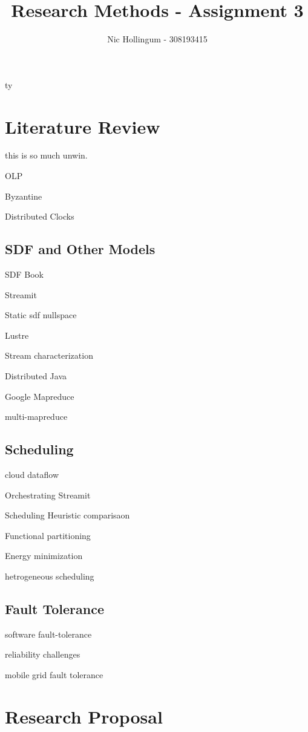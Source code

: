 ty
\author{Nic Hollingum - 308193415}
\title{Research Methods - Assignment 3}



\maketitle

\section{Literature Review}

this is so much unwin.

OLP \cite{hen99}

Byzantine \cite{lam86}

Distributed Clocks \cite{lam78}

\subsection{SDF and Other Models}

SDF Book \cite{sdfBook}

Streamit \cite{theis02}

Static sdf nullspace \cite{lee87}

Lustre \cite{cas87}

Stream characterization \cite{theis10}

Distributed Java \cite{par03}

Google Mapreduce \cite{dea08}

multi-mapreduce \cite{ran07}

\subsection{Scheduling}

cloud dataflow \cite{tsa09}

Orchestrating Streamit \cite{mal08}

Scheduling Heuristic comparisaon \cite{Kha94}

Functional partitioning \cite{li10}

Energy minimization \cite{boy01}

hetrogeneous scheduling \cite{len87}

\subsection{Fault Tolerance}

software fault-tolerance \cite{ran75}

reliability challenges \cite{ree06}

mobile grid fault tolerance\cite{lit07}

\section{Research Proposal}





